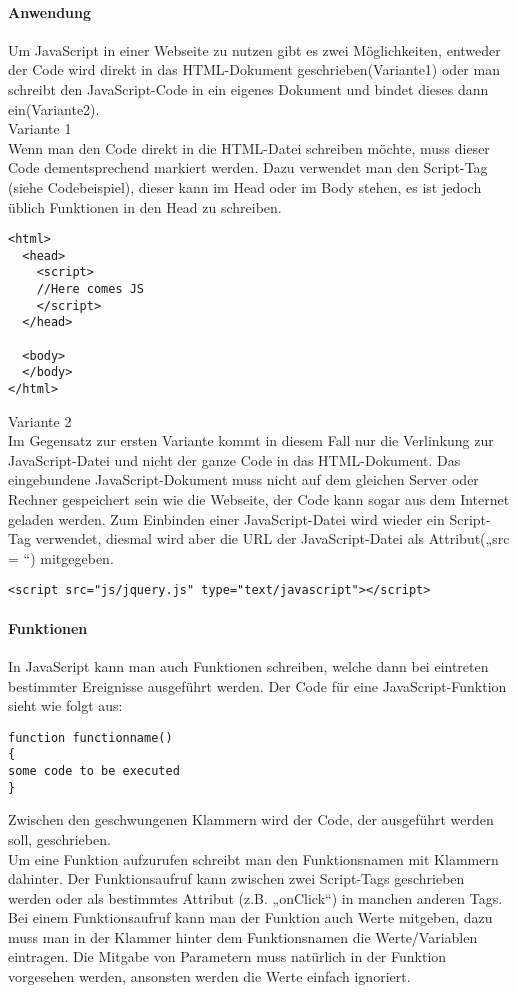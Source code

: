 \paragraph*{Anwendung}
Um JavaScript in einer Webseite zu nutzen gibt es zwei Möglichkeiten, entweder der Code wird direkt in das HTML-Dokument geschrieben(Variante1) oder man schreibt den JavaScript-Code in ein eigenes Dokument und bindet dieses dann ein(Variante2).\\
Variante 1\\
Wenn man den Code direkt in die HTML-Datei schreiben möchte, muss dieser Code dementsprechend markiert werden. Dazu verwendet man den Script-Tag (siehe Codebeispiel), dieser kann im Head oder im Body stehen, es ist jedoch üblich Funktionen in den Head zu schreiben.\\
\begin{lstlisting}
<html>
  <head>
    <script>
	//Here comes JS
    </script> 
  </head>
  
  <body>
  </body>
</html>
\end{lstlisting}


Variante 2\\
Im Gegensatz zur ersten Variante kommt in diesem Fall nur die Verlinkung zur JavaScript-Datei und nicht der ganze Code in das HTML-Dokument. Das eingebundene JavaScript-Dokument muss nicht auf dem gleichen Server oder Rechner gespeichert sein wie die Webseite, der Code kann sogar aus dem Internet geladen werden. Zum Einbinden einer JavaScript-Datei wird wieder ein Script-Tag verwendet, diesmal wird aber die URL der JavaScript-Datei als Attribut(„src = “) mitgegeben.\\
\begin{lstlisting}
<script src="js/jquery.js" type="text/javascript"></script>
\end{lstlisting}

\paragraph*{Funktionen}
In JavaScript kann man auch Funktionen schreiben, welche dann bei eintreten bestimmter Ereignisse ausgeführt werden. Der Code für eine JavaScript-Funktion sieht wie folgt aus:\\
\begin{lstlisting}
function functionname()
{
some code to be executed
}
\end{lstlisting}
Zwischen den geschwungenen Klammern wird der Code, der ausgeführt werden soll, geschrieben.\\
Um eine Funktion aufzurufen schreibt man den Funktionsnamen mit Klammern dahinter. Der Funktionsaufruf kann zwischen zwei Script-Tags geschrieben werden oder als bestimmtes Attribut (z.B. „onClick“) in manchen anderen Tags.\\
Bei einem Funktionsaufruf kann man der Funktion auch Werte mitgeben, dazu muss man in der Klammer hinter dem Funktionsnamen die Werte/Variablen eintragen. Die Mitgabe von Parametern muss natürlich in der Funktion vorgesehen werden, ansonsten werden die Werte einfach ignoriert.\\


